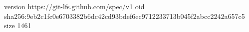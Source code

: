 version https://git-lfs.github.com/spec/v1
oid sha256:9eb2c1fc0e6703382b6dc42cd93bdef6ec9712233713b045f2abcc2242a657c5
size 1461
